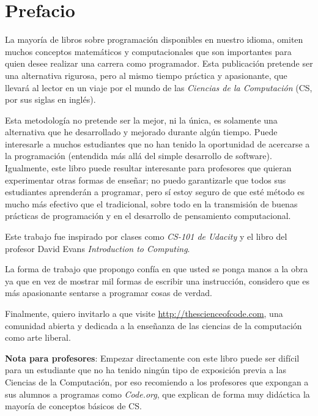\thispagestyle{empty}

\chapter{Prefacio}
    La mayoría de libros sobre programación disponibles en nuestro idioma, omiten muchos conceptos matemáticos y computacionales que son importantes para quien desee realizar una carrera como programador. Esta publicación pretende ser una alternativa rigurosa, pero al mismo tiempo práctica y apasionante, que llevará al lector en un viaje por el mundo de las \emph{Ciencias de la Computación} (CS, por sus siglas en inglés).    
    
    Esta metodología no pretende ser la mejor, ni la única, es solamente una alternativa que he desarrollado y mejorado durante algún tiempo. Puede interesarle a muchos estudiantes que no han tenido la oportunidad de acercarse a la programación (entendida más allá del simple desarrollo de software). Igualmente, este libro puede resultar interesante para profesores que quieran experimentar otras formas de enseñar; no puedo garantizarle que todos sus estudiantes aprenderán a programar, pero sí estoy seguro de que esté método es mucho más efectivo que el tradicional, sobre todo en la transmisión de buenas prácticas de programación y en el desarrollo de pensamiento computacional.
    
    Este trabajo fue inspirado por clases como \emph{CS-101 de Udacity} y el libro del profesor David Evans \emph{Introduction to Computing}. 
    
    La forma de trabajo que propongo confía en que usted se ponga manos a la obra ya que en vez de mostrar mil formas de escribir una instrucción, considero que es más apasionante sentarse a programar cosas de verdad.
    
  Finalmente, quiero invitarlo a que visite \url{http://thescienceofcode.com}, una comunidad abierta y dedicada a la enseñanza de las ciencias de la computación como arte liberal.

    
    \newpage
    \thispagestyle{empty}
        \textbf{Nota para profesores}: Empezar directamente con este libro puede ser difícil para un estudiante que no ha tenido ningún tipo de exposición previa a las Ciencias de la Computación, por eso recomiendo a los profesores que expongan a sus alumnos a programas como \emph{Code.org}, que explican de forma muy didáctica la mayoría de conceptos básicos de CS.
      
    
  
    
 